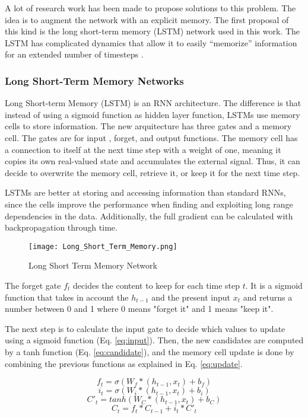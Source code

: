 A lot of research work has been made to propose solutions to this problem. The idea is to augment the network with an explicit memory. The first proposal of this kind is the long short-term memory (LSTM) network used in this work. The LSTM has complicated dynamics that allow it to easily “memorize” information for an extended number of timesteps \cite{zaremba2014recurrent}.


\subsubsection{Long Short-Term Memory Networks}
Long Short-term Memory (LSTM) is an RNN architecture. The difference is that instead of using a sigmoid function as hidden layer function, LSTMs use memory cells to store information. The new arquitecture has three gates and a memory cell. The gates are for input , forget, and output functions. The memory cell has a connection to itself at the next time step with a weight of one, meaning it copies its own real-valued state and accumulates the external signal\cite{lecun2015deep}. Thus, it can decide to overwrite the memory cell, retrieve it, or keep it for the next time step\cite{zaremba2014recurrent}. 

LSTMs are better at storing and accessing information than standard RNNs, since the cells improve the performance when finding and exploiting long range dependencies in the data. Additionally, the full gradient can be calculated with backpropagation through time.\cite{graves2013generating}

\begin{figure}
\label{fig:lstm}
\center
\texttt{[image: Long\_Short\_Term\_Memory.png]}
\caption{Long Short Term Memory Network}
\end{figure}

The forget gate $f_t$ decides the content to keep for each time step $t$. It is a sigmoid function that takes in account the $h_{t-1}$ and the present input $x_t$ and returns a number between 0 and 1 where 0 means "forget it" and 1 means "keep it". 

The next step is to calculate the input gate to decide which values to update using a sigmoid function (Eq. \ref{eq:input}). Then, the new candidates are computed by a tanh function (Eq. \ref{eq:candidate}), and the memory cell update is done by combining the previous functions as explained in Eq. \ref{eq:update}.

\begin{equation} \label{eq:forget}
f_t=\sigma(W_f*(h_{t-1},x_t)+b_f)
\end{equation}
\begin{equation} \label{eq:input}
i_t=\sigma(W_i*(h_{t-1},x_t)+b_i)
\end{equation}
\begin{equation} \label{eq:candidate}
C'_t=tanh(W_C*(h_{t-1},x_t)+b_C)
\end{equation}
\begin{equation} \label{eq:update}
C_t=f_t*C_{t-1}+i_t*C'_t
\end{equation}

